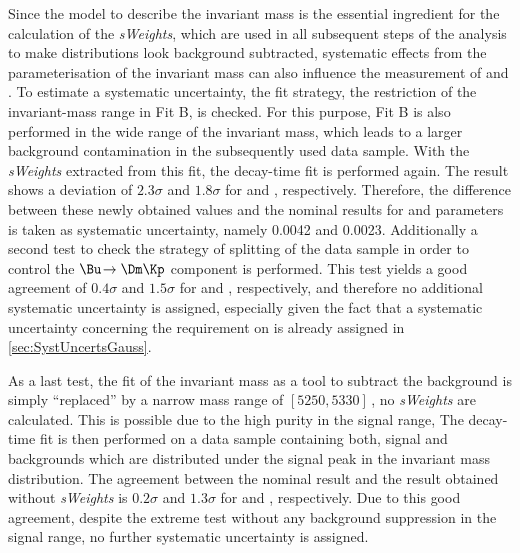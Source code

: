 Since the model to describe the invariant mass is the essential ingredient for the calculation of the \emph{sWeights}, which are used in all subsequent steps of the analysis to make distributions look background subtracted, systematic effects from the parameterisation of the invariant mass can also influence the measurement of \Sf and \Sfbar.
To estimate a systematic uncertainty, the fit strategy, \ie the restriction of the invariant-mass range in Fit B, is checked.
For this purpose, Fit B is also performed in the wide range of the invariant mass, which leads to a larger background contamination in the subsequently used data sample.
With the \emph{sWeights} extracted from this fit, the decay-time fit is performed again.
The result shows a deviation of $2.3\sigma$ and $1.8\sigma$ for \Sf and \Sfbar, respectively.
Therefore, the difference between these newly obtained values and the nominal results for \Sf and \Sfbar parameters is taken as systematic uncertainty, namely \num{0.0042} and \num{0.0023}.
Additionally a second test to check the strategy of splitting of the data sample in order to control the $\Bu\!\to\Dm\Kp$ component is performed.
This test yields a good agreement of $0.4\sigma$ and $1.5\sigma$ for \Sf and \Sfbar, respectively, and therefore no additional systematic uncertainty is assigned, especially given the fact that a systematic uncertainty concerning the requirement on \dllkpi is already assigned in \cref{sec:SystUncertsGauss}.

As a last test, the fit of the invariant mass as a tool to subtract the background is simply \enquote{replaced} by a narrow mass range of $[5250,5330]\,$\si[per-mode=symbol]{\MeVcc}, \ie no \emph{sWeights} are calculated.
This is possible due to the high purity in the signal range,
The decay-time fit is then performed on a data sample containing both, signal and backgrounds which are distributed under the signal peak in the invariant mass distribution.
The agreement between the nominal result and the result obtained without \emph{sWeights} is $0.2\sigma$ and $1.3\sigma$ for \Sf and \Sfbar, respectively.
Due to this good agreement, despite the extreme test without any background suppression in the signal range, no further systematic uncertainty is assigned.

